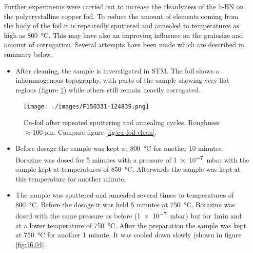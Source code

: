 Further experiments were carried out to increase the cleanlyness of the h-BN on the polycrystalline copper foil. To reduce the amount of elements coming from the body of the foil it is repeatedly sputtered and annealed to temperatures as high as \SI{800}{\degreeCelsius}. This may have also an improving influence on the grainsize and amount of corrugation. Several attempts have been made which are described in summary below.
\begin{itemize}
 \item After cleaning, the sample is inverstigated in STM. The foil shows a inhommogenous topography, with parts of the sample showing very flat regions (figure \ref{fig:30-31.03}) while others still remain heavily corrugated.
\end{itemize}
\begin{figure}[h!]
 \centering
 \texttt{[image: ./images/F150331-124839.png]}
 \caption{Cu-foil after repeated sputtering and annealing cycles. Roughness $\approx \SI{100}{\pico\meter}$. Compare figure \ref{fig:cu-foil-clean}.}
 \label{fig:30-31.03}
\end{figure}
\begin{itemize}
 \item Before dosage the sample was kept at \SI{800}{\degreeCelsius} for another 10 minutes.
Borazine was dosed for 5 minutes with a pressure of \SI{1e-7}{\milli \bar} with the sample kept at temperatures of \SI{850}{\degreeCelsius}. Afterwards the sample was kept at this temperature for another minute.
\end{itemize}
\begin{itemize}
 \item The sample was sputtered and annealed several times to temperatures of \SI{800}{\degreeCelsius}. Before the dosage it was held 5 minutes at \SI{750}{\degreeCelsius}. Borazine was dosed with the same pressure as before (\SI{1e-7}{\milli \bar}) but for 1min and at a lower temperature of \SI{750}{\degreeCelsius}. After the preparation the sample was kept at \SI{750}{\degreeCelsius} for another 1 minute. It was cooled down slowly (shown in figure \ref{fig:16.04}.
\end{itemize}

